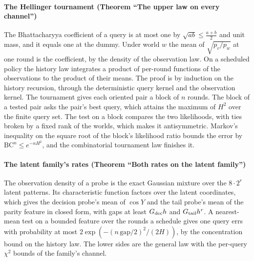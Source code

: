 \paragraph{The Hellinger tournament (Theorem ``The upper law on every channel'')} The
Bhattacharyya coefficient of a query is at most one by $\sqrt{ab}\le\frac{a+b}{2}$ and unit mass,
and it equals one at the dummy. Under world $w$ the mean of $\sqrt{p_{v}/p_{w}}$ at one round is the
coefficient, by the density of the observation law. On a scheduled policy the history law
integrates a product of per-round functions of the observations to the product of their means. The
proof is by induction on the history recursion, through the deterministic query kernel and the
observation kernel. The tournament gives each oriented pair a block of $n$ rounds. The block of a
tested pair asks the pair's best query, which attains the maximum of $H^{2}$ over the finite query
set. The test on a block compares the two likelihoods, with ties broken by a fixed rank of the
worlds, which makes it antisymmetric. Markov's inequality on the square root of the block's
likelihood ratio bounds the error by $\mathrm{BC}^{n}\le e^{-nH^{2}}$, and the combinatorial
tournament law finishes it.


\paragraph{The latent family's rates (Theorem ``Both rates on the latent family'')} The observation
density of a probe is the exact Gaussian mixture over the $8\cdot2^{r}$ latent patterns. Its
characteristic function factors over the latent coordinates, which gives the decision probe's mean
of $\cos Y$ and the tail probe's mean of the parity feature in closed form, with gaps at least
$G_{\rm dec}h$ and $G_{\rm tail}h^{r}$. A nearest-mean test on a bounded feature over the rounds a
schedule gives one query errs with probability at most $2\exp(-(n\,\mathrm{gap}/2)^{2}/(2H))$, by the
concentration bound on the history law. The lower sides are the general law with the per-query
$\chi^{2}$ bounds of the family's channel.

